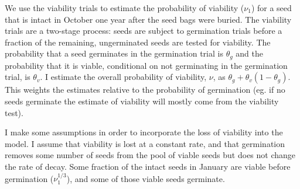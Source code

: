\documentclass[12pt, oneside, titlepage]{article}   	%
\begin{document}

We use the viability trials to estimate the probability of viability ($\nu_1$) for a seed that is intact in October one year after the seed bags were buried. The viability trials are a two-stage process: seeds are subject to germination trials before a fraction of the remaining, ungerminated seeds are tested for viability. The probability that a seed germinates in the germination trial is $\theta_g$ and the probability that it is viable, conditional on not germinating in the germination trial, is $\theta_v$. I estimate the overall probability of viability, $\nu$, as $\theta_g + \theta_v (1-\theta_g)$. This weights the estimates relative to the probability of germination (eg. if no seeds germinate the estimate of viability will mostly come from the viability test).

I make some assumptions in order to incorporate the loss of viability into the model. I assume that viability is lost at a constant rate, and that germination removes some number of seeds from the pool of viable seeds but does not change the rate of decay. Some fraction of the intact seeds in January are viable before germination ($\nu_1^{1/3}$), and some of those viable seeds germinate. 
\end{document}
